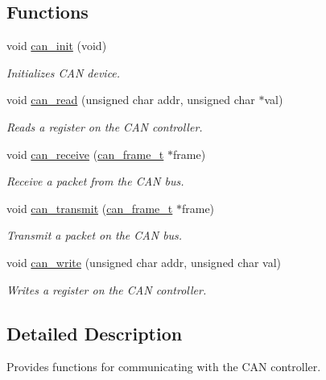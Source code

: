\subsection*{Functions}
\begin{DoxyCompactItemize}
\item 
\hypertarget{group___c_a_n_gac7781a37ca14c5bf42c4fe9de1f4daa8}{void \hyperlink{group___c_a_n_gac7781a37ca14c5bf42c4fe9de1f4daa8}{can\-\_\-init} (void)}\label{group___c_a_n_gac7781a37ca14c5bf42c4fe9de1f4daa8}

\begin{DoxyCompactList}\small\item\em Initializes C\-A\-N device. \end{DoxyCompactList}\item 
void \hyperlink{group___c_a_n_gad7a2e329d358b34cb55d01a8dcfa46f3}{can\-\_\-read} (unsigned char addr, unsigned char $\ast$val)
\begin{DoxyCompactList}\small\item\em Reads a register on the C\-A\-N controller. \end{DoxyCompactList}\item 
void \hyperlink{group___c_a_n_gaca9b739b48885d2c581ab0271eed1e00}{can\-\_\-receive} (\hyperlink{group___c_a_n_ga78ee122f82484a1d73d82b66b1000d64}{can\-\_\-frame\-\_\-t} $\ast$frame)
\begin{DoxyCompactList}\small\item\em Receive a packet from the C\-A\-N bus. \end{DoxyCompactList}\item 
void \hyperlink{group___c_a_n_ga253ec448799ca5ac8097eb124af53593}{can\-\_\-transmit} (\hyperlink{group___c_a_n_ga78ee122f82484a1d73d82b66b1000d64}{can\-\_\-frame\-\_\-t} $\ast$frame)
\begin{DoxyCompactList}\small\item\em Transmit a packet on the C\-A\-N bus. \end{DoxyCompactList}\item 
void \hyperlink{group___c_a_n_ga3f2fa933a534a6cf388b0857cb267cb2}{can\-\_\-write} (unsigned char addr, unsigned char val)
\begin{DoxyCompactList}\small\item\em Writes a register on the C\-A\-N controller. \end{DoxyCompactList}\end{DoxyCompactItemize}


\subsection{Detailed Description}
Provides functions for communicating with the C\-A\-N controller. 

